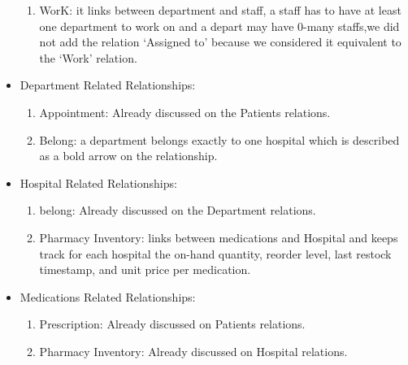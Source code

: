 \documentclass[a4paper,12pt]{article}
\begin{document}
\begin{itemize}
\begin{enumerate}
        \item WorK: it links between department and staff, a staff has to have at least one department to work on and a depart may have 0-many staffs,we did not add the relation ‘Assigned to’ because we considered it equivalent to the ‘Work’ relation.
    \end{enumerate}
    \item Department Related Relationships:
    \begin{enumerate}
        \item Appointment: Already discussed on the Patients relations.
        \item Belong: a department belongs exactly to one hospital which is described as a bold arrow on the relationship.
    \end{enumerate}
    \item Hospital Related Relationships:
    \begin{enumerate}
        \item belong: Already discussed on the Department relations.
        \item Pharmacy Inventory: links between medications and Hospital and keeps track for each hospital the on-hand quantity, reorder level, last restock timestamp,
and unit price per medication.
    \end{enumerate}
    \item Medications Related Relationships:
    \begin{enumerate}
        \item Prescription: Already discussed on Patients relations.
        \item Pharmacy Inventory: Already discussed on Hospital relations.
    \end{enumerate}

\end{itemize} 
\end{document}
